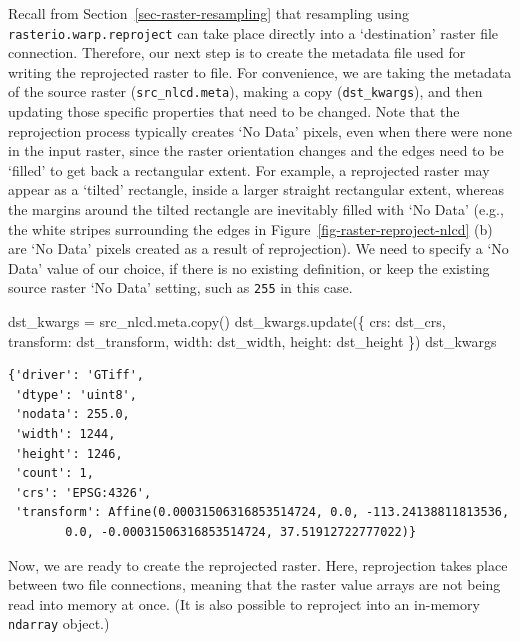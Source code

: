 \documentclass[
  letterpaper,
]{krantz}
\newenvironment{Shaded}{\begin{snugshade}}{\end{snugshade}}
\newcommand{\NormalTok}[1]{\textcolor[rgb]{0.00,0.23,0.31}{#1}}
\newcommand{\OperatorTok}[1]{\textcolor[rgb]{0.37,0.37,0.37}{#1}}
\newcommand{\StringTok}[1]{\textcolor[rgb]{0.13,0.47,0.30}{#1}}
\begin{document}
Recall from Section~\ref{sec-raster-resampling} that resampling using
\texttt{rasterio.warp.reproject} can take place directly into a
`destination' raster file connection. Therefore, our next step is to
create the metadata file used for writing the reprojected raster to
file. For convenience, we are taking the metadata of the source raster
(\texttt{src\_nlcd.meta}), making a copy (\texttt{dst\_kwargs}), and
then updating those specific properties that need to be changed. Note
that the reprojection process typically creates `No Data' pixels, even
when there were none in the input raster, since the raster orientation
changes and the edges need to be `filled' to get back a rectangular
extent. For example, a reprojected raster may appear as a `tilted'
rectangle, inside a larger straight rectangular extent, whereas the
margins around the tilted rectangle are inevitably filled with `No Data'
(e.g., the white stripes surrounding the edges in
Figure~\ref{fig-raster-reproject-nlcd} (b) are `No Data' pixels created
as a result of reprojection). We need to specify a `No Data' value of
our choice, if there is no existing definition, or keep the existing
source raster `No Data' setting, such as \texttt{255} in this case.

\begin{Shaded}
\begin{Highlighting}[]
\NormalTok{dst\_kwargs }\OperatorTok{=}\NormalTok{ src\_nlcd.meta.copy()}
\NormalTok{dst\_kwargs.update(\{}
    \StringTok{\textquotesingle{}crs\textquotesingle{}}\NormalTok{: dst\_crs,}
    \StringTok{\textquotesingle{}transform\textquotesingle{}}\NormalTok{: dst\_transform,}
    \StringTok{\textquotesingle{}width\textquotesingle{}}\NormalTok{: dst\_width,}
    \StringTok{\textquotesingle{}height\textquotesingle{}}\NormalTok{: dst\_height}
\NormalTok{\})}
\NormalTok{dst\_kwargs}
\end{Highlighting}
\end{Shaded}

\begin{verbatim}
{'driver': 'GTiff',
 'dtype': 'uint8',
 'nodata': 255.0,
 'width': 1244,
 'height': 1246,
 'count': 1,
 'crs': 'EPSG:4326',
 'transform': Affine(0.00031506316853514724, 0.0, -113.24138811813536,
        0.0, -0.00031506316853514724, 37.51912722777022)}
\end{verbatim}

Now, we are ready to create the reprojected raster. Here, reprojection
takes place between two file connections, meaning that the raster value
arrays are not being read into memory at once. (It is also possible to
reproject into an in-memory \texttt{ndarray} object.)
\end{document}
